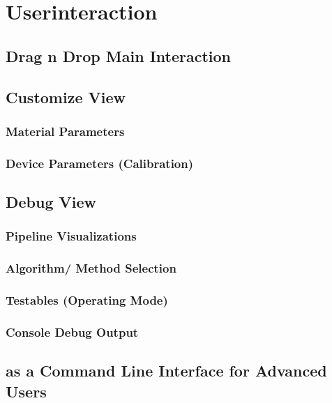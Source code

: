 \documentclass[../ClassicThesis.tex]{subfiles}
\begin{document}
\chapter{Userinteraction}\label{ch:userinteraction}

\section{Drag n Drop Main Interaction}

\section{Customize View}

\subsection{Material Parameters}
\subsection{Device Parameters (Calibration)}

\section{Debug View}

\subsection{Pipeline Visualizations}
\subsection{Algorithm/ Method Selection}
\subsection{Testables (Operating Mode)}
\subsection{Console Debug Output}

\section{{\platener} as a Command Line Interface for Advanced Users}
\label{sec:walkthrough-cli}
\end{document}
